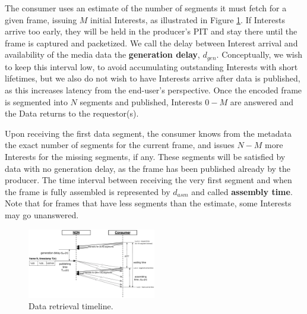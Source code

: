 \documentclass{icn/sig-alternate-2013} %
\begin{document}
The consumer uses an estimate of the number of segments it must fetch for a given frame, issuing $M$ initial Interests, as illustrated in Figure \ref{fig:pull}. If Interests arrive too early, they will be held in the producer's PIT and stay there until the frame is captured and packetized. We call the delay between Interest arrival and availability of the media data the \textbf{generation delay}, $d_{gen}$. Conceptually, we wish to keep this interval low, to avoid accumulating outstanding Interests with short lifetimes, but we also do not wish to have Interests arrive after data is published, as this increases latency from the end-user's perspective.  Once the encoded frame is segmented into $N$ segments and published, Interests $0 - M$ are answered and the Data returns to the requestor(s). 

Upon receiving the first data segment, the consumer knows from the metadata the exact number of segments for the current frame, and issues $N - M$ more Interests for the missing segments, if any. These segments will be satisfied by data with no generation delay, as the frame has been published already by the producer. The time interval between receiving the very first segment and when the frame is fully assembled is represented by $d_{asm}$ and called \textbf{assembly time}. Note that for frames that have less segments than the estimate, some Interests may go unanswered.%
 

\begin{figure}[t!]
\centering
\includegraphics[width=0.5\textwidth]{frame-fetch}
\vspace{-18pt}
\caption{Data retrieval timeline.}
\label{fig:pull}
\end{figure}
\end{document}
